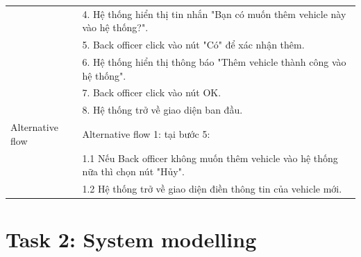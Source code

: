 \documentclass[a4paper]{article}
\begin{document}
\begin{enumerate}
\begin{enumerate}
\begin{tabular}{|p{3cm} | p{10cm} |}
         &4. Hệ thống hiển thị tin nhắn "Bạn có muốn thêm vehicle này vào hệ thống?". \\
         &5. Back officer click vào nút "Có" để xác nhận thêm.\\
         &6. Hệ thống hiển thị thông báo "Thêm vehicle thành công vào hệ thống". \\
         &7. Back officer click vào nút OK. \\
         &8. Hệ thống trở về giao diện ban đầu.\\
         \hline
         Alternative flow & 
         Alternative flow 1: tại bước 5: \\
         &1.1 Nếu Back officer không muốn thêm vehicle vào hệ thống nữa thì chọn nút "Hủy". \\
         &1.2 Hệ thống trở về giao diện điền thông tin của vehicle mới. \\
         \hline
    \end{tabular}
\end{enumerate}

\end{enumerate}
\section{Task 2:  System modelling}
\end{document}
